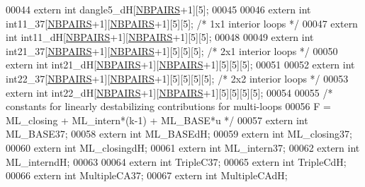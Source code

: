 \begin{DoxyCode}
00044 \textcolor{keyword}{extern} \textcolor{keywordtype}{int} dangle5\_dH[\hyperlink{constants_8h_a5e75221c779d618eab81e096f37e32ce}{NBPAIRS}+1][5];
00045 
00046 \textcolor{keyword}{extern} \textcolor{keywordtype}{int} int11\_37[\hyperlink{constants_8h_a5e75221c779d618eab81e096f37e32ce}{NBPAIRS}+1][\hyperlink{constants_8h_a5e75221c779d618eab81e096f37e32ce}{NBPAIRS}+1][5][5]; \textcolor{comment}{/* 1x1 interior loops */}
00047 \textcolor{keyword}{extern} \textcolor{keywordtype}{int} int11\_dH[\hyperlink{constants_8h_a5e75221c779d618eab81e096f37e32ce}{NBPAIRS}+1][\hyperlink{constants_8h_a5e75221c779d618eab81e096f37e32ce}{NBPAIRS}+1][5][5];
00048 
00049 \textcolor{keyword}{extern} \textcolor{keywordtype}{int} int21\_37[\hyperlink{constants_8h_a5e75221c779d618eab81e096f37e32ce}{NBPAIRS}+1][\hyperlink{constants_8h_a5e75221c779d618eab81e096f37e32ce}{NBPAIRS}+1][5][5][5]; \textcolor{comment}{/* 2x1 interior loops */}
00050 \textcolor{keyword}{extern} \textcolor{keywordtype}{int} int21\_dH[\hyperlink{constants_8h_a5e75221c779d618eab81e096f37e32ce}{NBPAIRS}+1][\hyperlink{constants_8h_a5e75221c779d618eab81e096f37e32ce}{NBPAIRS}+1][5][5][5];
00051 
00052 \textcolor{keyword}{extern} \textcolor{keywordtype}{int} int22\_37[\hyperlink{constants_8h_a5e75221c779d618eab81e096f37e32ce}{NBPAIRS}+1][\hyperlink{constants_8h_a5e75221c779d618eab81e096f37e32ce}{NBPAIRS}+1][5][5][5][5]; \textcolor{comment}{/* 2x2 interior loops */}
00053 \textcolor{keyword}{extern} \textcolor{keywordtype}{int} int22\_dH[\hyperlink{constants_8h_a5e75221c779d618eab81e096f37e32ce}{NBPAIRS}+1][\hyperlink{constants_8h_a5e75221c779d618eab81e096f37e32ce}{NBPAIRS}+1][5][5][5][5];
00054 
00055 \textcolor{comment}{/* constants for linearly destabilizing contributions for multi-loops}
00056 \textcolor{comment}{   F = ML\_closing + ML\_intern*(k-1) + ML\_BASE*u  */}
00057 \textcolor{keyword}{extern} \textcolor{keywordtype}{int} ML\_BASE37;
00058 \textcolor{keyword}{extern} \textcolor{keywordtype}{int} ML\_BASEdH;
00059 \textcolor{keyword}{extern} \textcolor{keywordtype}{int} ML\_closing37;
00060 \textcolor{keyword}{extern} \textcolor{keywordtype}{int} ML\_closingdH;
00061 \textcolor{keyword}{extern} \textcolor{keywordtype}{int} ML\_intern37;
00062 \textcolor{keyword}{extern} \textcolor{keywordtype}{int} ML\_interndH;
00063 
00064 \textcolor{keyword}{extern} \textcolor{keywordtype}{int} TripleC37;
00065 \textcolor{keyword}{extern} \textcolor{keywordtype}{int} TripleCdH;
00066 \textcolor{keyword}{extern} \textcolor{keywordtype}{int} MultipleCA37;
00067 \textcolor{keyword}{extern} \textcolor{keywordtype}{int} MultipleCAdH;

\end{DoxyCode}
